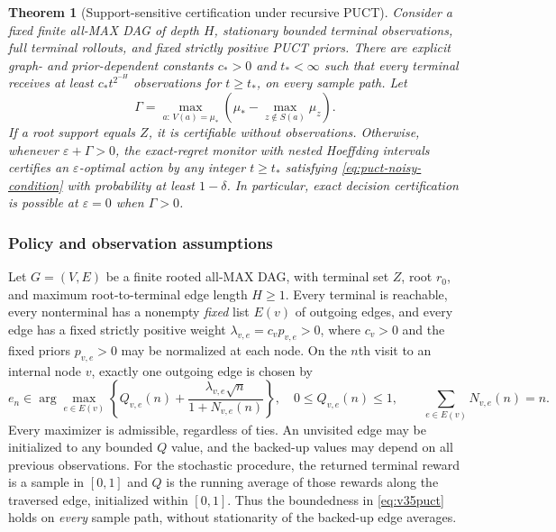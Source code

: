 \documentclass{article}
\theoremstyle{plain}
\newtheorem{theorem}{Theorem}[section]
\theoremstyle{definition}
\begin{document}
\begin{theorem}[Support-sensitive certification under recursive PUCT]
\label{thm:puct-noisy-main}
Consider a fixed finite all-MAX DAG of depth $H$, stationary bounded terminal
observations, full terminal rollouts, and fixed strictly positive PUCT priors.
There are explicit graph- and prior-dependent constants $c_*>0$ and $t_*<\infty$
such that every terminal receives at least $c_*t^{2^{-H}}$ observations for
$t\ge t_*$, on every sample path. Let
\[
 \Gamma=\max_{a:\,V(a)=\mu_*}
 \left(\mu_*-\max_{z\notin S(a)}\mu_z\right).
\]
If a root support equals $Z$, it is certifiable without observations.
Otherwise, whenever $\varepsilon+\Gamma>0$, the exact-regret monitor with
nested Hoeffding intervals certifies an $\varepsilon$-optimal action by any
integer $t\ge t_*$ satisfying
\eqref{eq:puct-noisy-condition}
with probability at least $1-\delta$. In particular, exact decision
certification is possible at $\varepsilon=0$ when $\Gamma>0$.
\end{theorem}


\subsubsection{Policy and observation assumptions}
Let $G=(V,E)$ be a finite rooted all-MAX DAG, with terminal set $Z$, root
$r_0$, and maximum root-to-terminal edge length $H\ge1$. Every terminal is
reachable, every nonterminal has a nonempty \emph{fixed} list $E(v)$ of
outgoing edges, and every edge has a fixed strictly positive weight
$\lambda_{v,e}=c_vp_{v,e}>0$, where $c_v>0$ and the fixed priors
$p_{v,e}>0$ may be normalized at each node. On the $n$th visit to an
internal node $v$, exactly one outgoing edge is chosen by
\begin{equation}
 e_n\in\arg\max_{e\in E(v)}
 \left\{Q_{v,e}(n)+\frac{\lambda_{v,e}\sqrt{n}}{1+N_{v,e}(n)}\right\},
 \quad
 0\le Q_{v,e}(n)\le1,\qquad
 \sum_{e\in E(v)}N_{v,e}(n)=n.
 \label{eq:v35puct}
\end{equation}
Every maximizer is admissible, regardless of ties. An unvisited edge may be
initialized to any bounded $Q$ value, and the backed-up values may depend on
all previous observations. For the stochastic procedure, the returned
terminal reward is a sample in $[0,1]$ and $Q$ is the running average of
those rewards along the traversed edge, initialized within $[0,1]$.
Thus the boundedness in \eqref{eq:v35puct} holds on \emph{every} sample path,
without stationarity of the backed-up edge averages.
\end{document}

